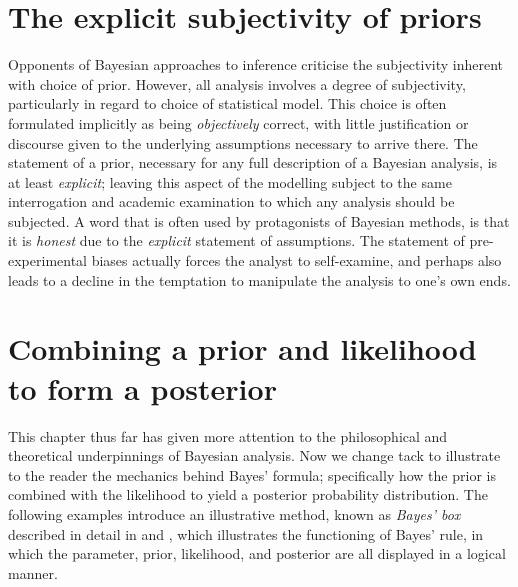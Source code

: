 \documentclass[11pt,fullpage]{book}
\begin{document}
\section{The explicit subjectivity of priors}
Opponents of Bayesian approaches to inference criticise the subjectivity inherent with choice of prior. However, all analysis involves a degree of subjectivity, particularly in regard to choice of statistical model. This choice is often formulated implicitly as being \textit{objectively} correct, with little justification or discourse given to the underlying assumptions necessary to arrive there. The statement of a prior, necessary for any full description of a Bayesian analysis, is at least \textit{explicit}; leaving this aspect of the modelling subject to the same interrogation and academic examination to which any analysis should be subjected. A word that is often used by protagonists of Bayesian methods, is that it is \textit{honest} due to the \textit{explicit} statement of assumptions. The statement of pre-experimental biases actually forces the analyst to self-examine, and perhaps also leads to a decline in the temptation to manipulate the analysis to one's own ends.



\section{Combining a prior and likelihood to form a posterior} 
This chapter thus far has given more attention to the philosophical and theoretical underpinnings of Bayesian analysis. Now we change tack to illustrate to the reader the mechanics behind Bayes' formula; specifically how the prior is combined with the likelihood to yield a posterior probability distribution. The following examples introduce an illustrative method, known as \textit{Bayes' box} described in detail in \cite{stewart2014teaching} and \cite{bolstad2007introduction}, which illustrates the functioning of Bayes' rule, in which the parameter, prior, likelihood, and posterior are all displayed in a logical manner.
\end{document}
